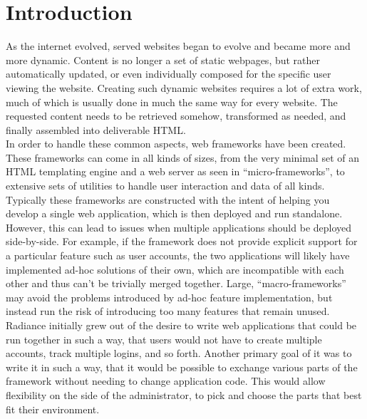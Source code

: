 \documentclass{sig-alternate}
\begin{document}
\printccsdesc

\newpage

\section{Introduction}
As the internet evolved, served websites began to evolve and became more and more dynamic. Content is no longer a set of static webpages, but rather automatically updated, or even individually composed for the specific user viewing the website. Creating such dynamic websites requires a lot of extra work, much of which is usually done in much the same way for every website. The requested content needs to be retrieved somehow, transformed as needed, and finally assembled into deliverable HTML. \\

In order to handle these common aspects, web frameworks have been created. These frameworks can come in all kinds of sizes, from the very minimal set of an HTML templating engine and a web server as seen in ``micro-frameworks''\cite{microframeworks}, to extensive sets of utilities to handle user interaction and data of all kinds. \\

Typically these frameworks are constructed with the intent of helping you develop a single web application, which is then deployed and run standalone. However, this can lead to issues when multiple applications should be deployed side-by-side. For example, if the framework does not provide explicit support for a particular feature such as user accounts, the two applications will likely have implemented ad-hoc solutions of their own, which are incompatible with each other and thus can't be trivially merged together. Large, ``macro-frameworks'' may avoid the problems introduced by ad-hoc feature implementation, but instead run the risk of introducing too many features that remain unused. \\

Radiance initially grew out of the desire to write web applications that could be run together in such a way, that users would not have to create multiple accounts, track multiple logins, and so forth. Another primary goal of it was to write it in such a way, that it would be possible to exchange various parts of the framework without needing to change application code. This would allow flexibility on the side of the administrator, to pick and choose the parts that best fit their environment.
\end{document}
